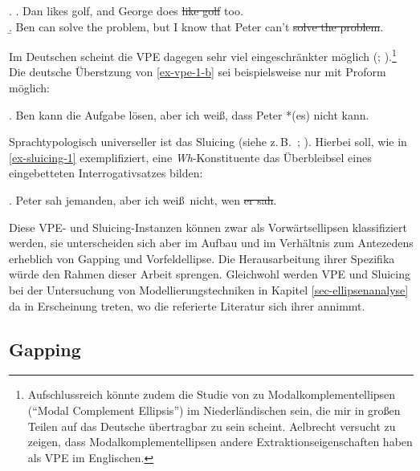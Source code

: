 \ex. \label{ex-vpe-1}
\a. Dan likes golf, and George does \sout{like golf} too. \\ \citep[(1)]{Dalrymple:etal:91}\label{ex-vpe-1-a}
\b. Ben can solve the problem, but I know that Peter can't \sout{solve the problem}. \hfill \citep[(32a), 134]{Winkler:05}\label{ex-vpe-1-b}

Im Deutschen scheint die VPE dagegen sehr viel eingeschränkter möglich (\citealt[158ff]{Lobeck:95}; \citealt[Chapter~3]{Winkler:05}).\footnote{Aufschlussreich könnte zudem die Studie von \citet[Chapter~2]{Aelbrecht:10} zu Modalkomplementellipsen ("`Modal Complement Ellipsis"') im Niederländischen sein, die mir in gro\ss en Teilen auf das Deutsche übertragbar zu sein scheint. Aelbrecht versucht zu zeigen, dass Modalkomplementellipsen andere Extraktionseigenschaften haben als VPE im Englischen.} Die deutsche Überstzung von \ref{ex-vpe-1-b} sei beispielsweise nur mit Proform möglich: 

\ex. Ben kann die Aufgabe lösen, aber ich weiß, dass Peter *(es) nicht kann. \hfill \citep[(33a), 134]{Winkler:05}\label{ex-vpe-2}

Sprachtypologisch universeller ist das Sluicing (siehe z.\,B.\  \citealt{Ross:69}; \citealt{Merchant:01}). Hierbei soll, wie in \ref{ex-sluicing-1} exemplifiziert, eine \textit{Wh}-Konstituente das Überbleibsel eines eingebetteten Interrogativsatzes bilden: 
 
\ex. \label{ex-sluicing-1}Peter sah jemanden, aber ich wei\ss\ nicht, wen \sout{er sah}.

Diese VPE- und Sluicing-Instanzen können zwar als Vorwärtsellipsen klassifiziert werden, sie unterscheiden sich aber im Aufbau und im Verhältnis zum Antezedens erheblich von Gapping und Vorfeldellipse. Die Herausarbeitung ihrer Spezifika würde den Rahmen dieser Arbeit sprengen. Gleichwohl werden VPE und Sluicing bei der Untersuchung von Modellierungstechniken in Kapitel \ref{sec-ellipsenanalyse} da in Erscheinung treten, wo die referierte Literatur sich ihrer annimmt.


\subsection{Gapping} \label{sec-gapping}

